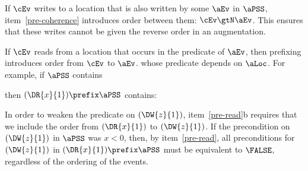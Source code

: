If $\cEv$ writes to a location that is also written by some $\aEv$ in $\aPSS$,
item~\ref{pre-coherence} introduces order between them: $\cEv \gtN \aEv$.  This
ensures that these writes cannot be given the reverse order in an augmentation.

If $\cEv$ reads from a location that occurs in the predicate of $\aEv$, then
prefixing introduces order from $\cEv$ to $\aEv$.
whose predicate depends on $\aLoc$. 
For example, if $\aPSS$ contains %
\begin{tikzinline}[node distance=1em]
\end{tikzinline}
then $(\DR{x}{1})\prefix\aPSS$ contains:
\begin{displaymathsmall}
\begin{tikzcenter}[node distance=1em]
\end{tikzcenter}
\qquad{}\qquad
\begin{tikzcenter}[node distance=1em]
\end{tikzcenter}
\end{displaymathsmall}
In order to weaken the predicate on $(\DW{z}{1})$, item~\ref{pre-read}b
requires that we include the order from $(\DR{x}{1})$ to $(\DW{z}{1})$.
If the precondition on $(\DW{z}{1})$ in $\aPSS$ was $x<0$, then, by
item~\ref{pre-read}, all preconditions for $(\DW{z}{1})$ in
$(\DR{x}{1})\prefix\aPSS$ must be equivalent to $\FALSE$, regardless of
the ordering of the events.


